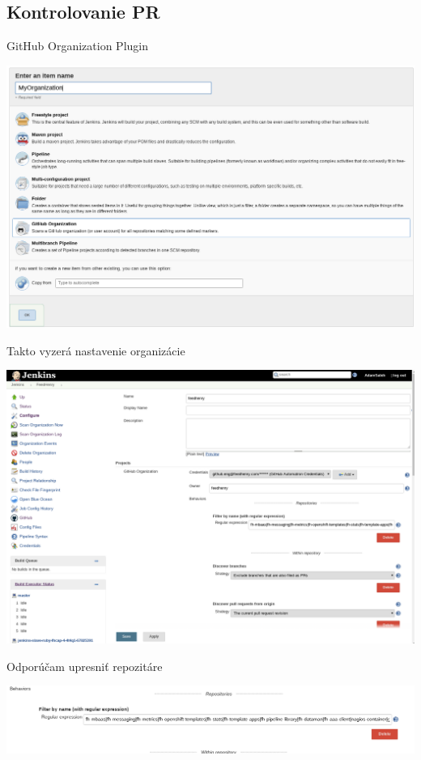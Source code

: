 \documentclass[bigger]{beamer}
\begin{document}
\subsection{Kontrolovanie PR}
\label{sec:orgf7e1fff}
\begin{frame}[label={sec:org9135c83}]{GitHub Organization Plugin}
\begin{center}
\includegraphics[width=.9\linewidth]{./015gh_org.png}
\end{center}
\end{frame}

\begin{frame}[label={sec:org2423c22}]{Takto vyzerá nastavenie organizácie}
\begin{center}
\includegraphics[width=.9\linewidth]{./017gh_org_feedhenry.png}
\end{center}
\end{frame}

\begin{frame}[label={sec:orgc64d854}]{Odporúčam upresniť repozitáre}
\begin{center}
\includegraphics[width=.9\linewidth]{./016gh_org_filter.png}
\end{center}
\end{frame}
\end{document}
